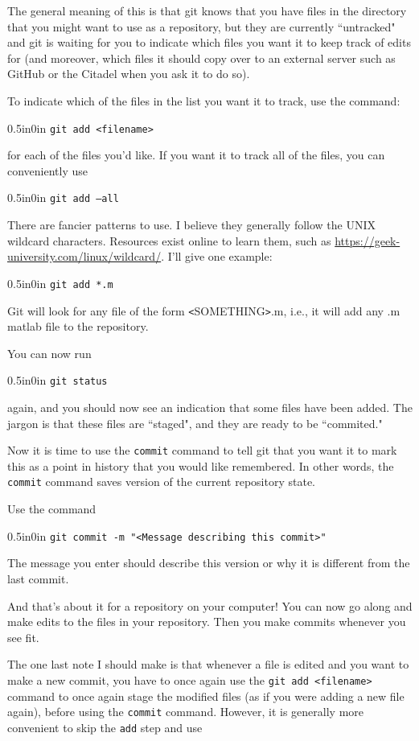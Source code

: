 \documentclass[11pt]{article}
\newcommand{\code}[1]{\begin{adjustwidth}{0.5in}{0in}
    \texttt{#1}
    \end{adjustwidth}}
\begin{document}
The general meaning of this is that git knows that you have files in the directory that you might want to use as a repository, but they are currently ``untracked" and git is waiting for you to indicate which files you want it to keep track of edits for (and moreover, which files it should copy over to an external server such as GitHub or the Citadel when you ask it to do so).

To indicate which of the files in the list you want it to track, use the command:

\code{git add <filename>}

for each of the files you'd like.  If you want it to track all of the files, you can conveniently use

\code{git add --all}

There are fancier patterns to use.  I believe they generally follow the UNIX wildcard characters.  Resources exist online to learn them, such as \url{https://geek-university.com/linux/wildcard/}.  I'll give one example:

\code{git add *.m}
 
 Git will look for any file of the form \texttt{<}SOMETHING\texttt{>}.m, i.e., it will add any .m matlab file to the repository.
 
 You can now run 
 
\code{git status}
 
 again, and you should now see an indication that some files have been added.  The jargon is that these files are ``staged", and they are ready to be ``commited."
 
 Now it is time to use the \texttt{commit} command to tell git that you want it to mark this as a point in history that you would like remembered.  In other words, the \texttt{commit} command saves version of the current repository state.  
 
 Use the command
 
 \code{git commit -m "<Message describing this commit>"}

The message you enter should describe this version or why it is different from the last commit.

And that's about it for a repository on your computer!  You can now go along and make edits to the files in your repository.  Then you make commits whenever you see fit.  

The one last note I should make is that whenever a file is edited and you want to make a new commit, you have to once again use the \texttt{git add <filename>} command to once again stage the modified files (as if you were adding a new file again), before using the \texttt{commit} command.  However, it is generally more convenient to skip the \texttt{add} step and use
\end{document}
